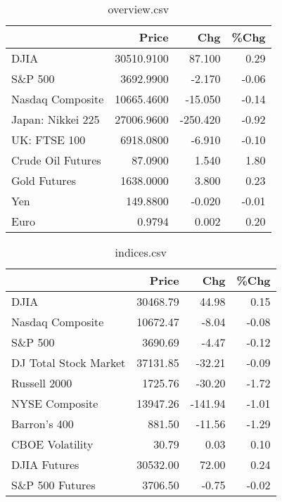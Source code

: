 \documentclass{article}%
\begin{document}
\begin{table}[htbp]%
\caption{overview.csv}%
\centering%
\begin{adjustbox}{width=1\textwidth}%
\begin{tabular}{lrrr}
\toprule
                  &      Price &      Chg &  \%Chg \\
\midrule
             DJIA & 30510.9100 &   87.100 &  0.29 \\
          S\&P 500 &  3692.9900 &   -2.170 & -0.06 \\
 Nasdaq Composite & 10665.4600 &  -15.050 & -0.14 \\
Japan: Nikkei 225 & 27006.9600 & -250.420 & -0.92 \\
     UK: FTSE 100 &  6918.0800 &   -6.910 & -0.10 \\
Crude Oil Futures &    87.0900 &    1.540 &  1.80 \\
     Gold Futures &  1638.0000 &    3.800 &  0.23 \\
              Yen &   149.8800 &   -0.020 & -0.01 \\
             Euro &     0.9794 &    0.002 &  0.20 \\
\bottomrule
\end{tabular}
%
\end{adjustbox}%
\end{table}

%


\begin{table}[htbp]%
\caption{indices.csv}%
\centering%
\begin{adjustbox}{width=1\textwidth}%
\begin{tabular}{lrrr}
\toprule
                      &    Price &     Chg &  \%Chg \\
\midrule
                 DJIA & 30468.79 &   44.98 &  0.15 \\
     Nasdaq Composite & 10672.47 &   -8.04 & -0.08 \\
              S\&P 500 &  3690.69 &   -4.47 & -0.12 \\
DJ Total Stock Market & 37131.85 &  -32.21 & -0.09 \\
         Russell 2000 &  1725.76 &  -30.20 & -1.72 \\
       NYSE Composite & 13947.26 & -141.94 & -1.01 \\
         Barron's 400 &   881.50 &  -11.56 & -1.29 \\
      CBOE Volatility &    30.79 &    0.03 &  0.10 \\
         DJIA Futures & 30532.00 &   72.00 &  0.24 \\
      S\&P 500 Futures &  3706.50 &   -0.75 & -0.02 \\
\bottomrule
\end{tabular}
%
\end{adjustbox}%
\end{table}
\end{document}
